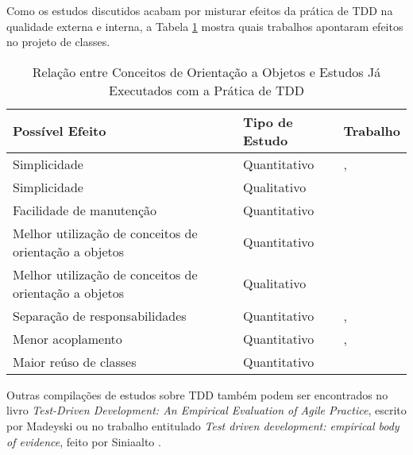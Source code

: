 Como os estudos discutidos acabam por misturar efeitos da prática de TDD na
qualidade externa e interna, a Tabela \ref{tab:comparativo} mostra
quais trabalhos apontaram efeitos no projeto de classes.

\begin{table}
	\centering
	\begin{tabular}{ | l | l | l |}
		
		\hline
		
		Possível Efeito & Tipo de Estudo & Trabalho\\

		\hline
		
		Simplicidade                                           & Quantitativo & \cite{janzen-arch-improvement}, \cite{janzen-saiedian} \\
		Simplicidade                                           & Qualitativo  & \cite{angela-li}\\
		Facilidade de manutenção                               & Quantitativo & \cite{langr}\\
		Melhor utilização de conceitos de orientação a objetos & Quantitativo & \cite{janzen-saiedian}\\
		Melhor utilização de conceitos de orientação a objetos & Qualitativo  & \cite{angela-li}\\
		Separação de responsabilidades                         & Quantitativo & \cite{janzen-saiedian}, \cite{steinberg}\\
		Menor acoplamento                                      & Quantitativo & \cite{janzen-saiedian}, \cite{steinberg}\\
		Maior reúso de classes                                 & Quantitativo & \cite{muller-e-hagner} \\

		\hline

	\end{tabular}
	\caption{Relação entre Conceitos de Orientação a Objetos e Estudos Já Executados com a Prática de TDD}
	\label{tab:comparativo}
\end{table}

Outras compilações de estudos sobre TDD também podem ser encontrados no livro
\textit{Test-Driven Development: An Empirical Evaluation of Agile Practice},
escrito por Madeyski \cite{madeyski-livro} ou no trabalho entitulado
\textit{Test driven development: empirical body of evidence}, feito por
Siniaalto \cite{tdd-body-of-evidence}.

